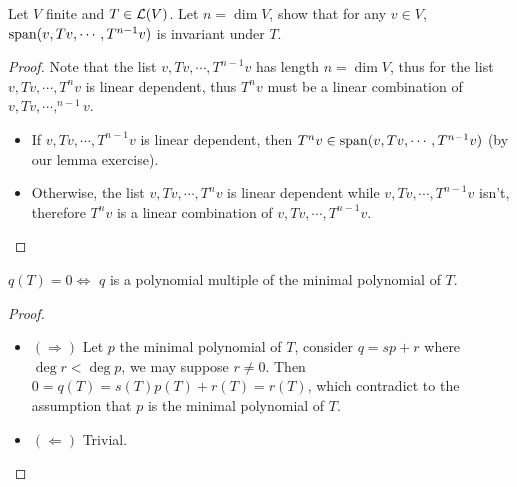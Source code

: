 \documentclass[../main.tex]{subfiles}
\begin{document}
\begin{exercise}
  Let $V$ finite and $T \in \mathcal{L}(V)$. Let $n = \dim V$, show that for any $v \in V$,
  $\operatorname{span}(v, Tv, \cdots, T^{n - 1}v)$ is invariant under $T$.
\end{exercise}
\begin{proof}
  Note that the list $v, Tv, \cdots, T^{n - 1}v$ has length $n = \dim V$, thus
  for the list $v, Tv, \cdots, T^nv$ is linear dependent, thus $T^nv$ must
  be a linear combination of $v, Tv, \cdots, ^{n - 1}v$.
  \begin{itemize}
    \item If $v, Tv, \cdots, T^{n - 1}v$ is linear dependent, then $T^nv \in \operatorname{span}(v, Tv, \cdots, T^{n - 1}v)$
          (by our lemma exercise).
    \item Otherwise, the list $v, Tv, \cdots, T^n v$ is linear dependent while $v, Tv, \cdots, T^{n - 1}v$ isn't,
          therefore $T^nv$ is a linear combination of $v, Tv, \cdots, T^{n - 1}v$.
  \end{itemize}
\end{proof}

\setcounter{theorem}{28}
\begin{theorem}
  $q(T) = 0 \iff$ $q$ is a polynomial multiple of the minimal polynomial of $T$.
\end{theorem}
\begin{proof}
  \begin{itemize}
    \item $(\Rightarrow)$ Let $p$ the minimal polynomial of $T$, consider
          $q = sp + r$ where $\deg r < \deg p$, we may suppose $r \neq 0$.
          Then $0 = q(T) = s(T)p(T) + r(T) = r(T)$, which contradict
          to the assumption that $p$ is the minimal polynomial of $T$.
    \item $(\Leftarrow)$ Trivial.
  \end{itemize}
\end{proof}
\end{document}

